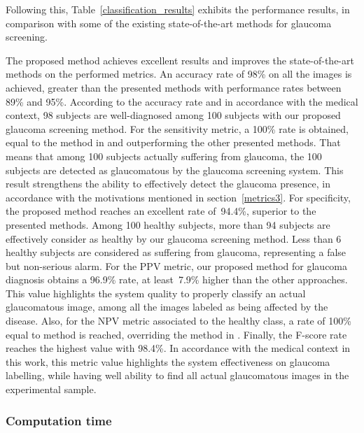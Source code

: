 Following this, \mbox{Table \ref{classification_results}} exhibits the performance results, in comparison with some of the existing state-of-the-art methods for glaucoma screening.



The proposed method achieves excellent results and improves the state-of-the-art methods on the performed metrics. An accuracy rate of 98\% on all the images is achieved, greater than the presented methods with performance rates between 89\% and 95\%. According to the accuracy rate and in accordance with the medical context, 98 subjects are well-diagnosed among 100 subjects with our proposed glaucoma screening method.
For the sensitivity metric, a 100\% rate is obtained, equal to the method in \citet{singh} and outperforming the other presented methods. That means that among 100 subjects actually suffering from glaucoma, the 100 subjects are detected as glaucomatous by the glaucoma screening system. This result strengthens the ability to effectively detect the glaucoma presence, in accordance with the motivations mentioned in \mbox{section \ref{metrics3}}.
For specificity, the proposed method reaches an excellent rate \mbox{of 94.4\%}, superior to the presented methods. Among 100 healthy subjects, more than 94 subjects are effectively consider as healthy by our glaucoma screening method. Less than 6 healthy subjects are considered as suffering from glaucoma, representing a false but non-serious alarm. 
For the PPV metric, our proposed method for glaucoma diagnosis obtains a 96.9\% rate, at \mbox{least 7.9\%} higher than the other approaches. This value highlights the system quality to properly classify an actual glaucomatous image, among all the images labeled as being affected by the disease. Also, for the NPV metric associated to the healthy class, a rate of 100\% equal to \citet{singh} method is reached, overriding the method in \citet{guerre}.
Finally, the F-score rate reaches the highest value with 98.4\%.
In accordance with the medical context in this work, this metric value highlights the system effectiveness on glaucoma labelling, while having well ability to find all actual glaucomatous images in the experimental sample.


\subsubsection{Computation time}

